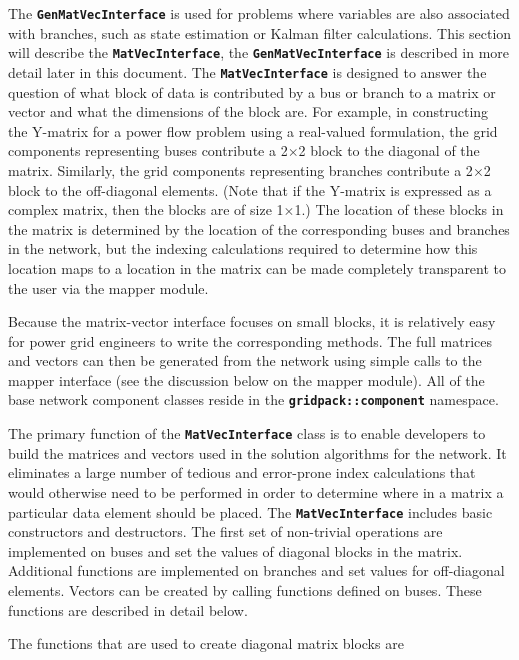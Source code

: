 \documentclass[12pt]{report} %
\begin{document}
The \texttt{\textbf{GenMatVecInterface}} is used for problems where variables are also associated with branches, such as state estimation or Kalman filter calculations. This section will describe the \texttt{\textbf{MatVecInterface}}, the \texttt{\textbf{GenMatVecInterface}} is described in more detail later in this document. The \texttt{\textbf{MatVecInterface}} is designed to answer the question of what block of data is contributed by a bus or branch to a matrix or vector and what the dimensions of the block are. For example, in constructing the Y-matrix for a power flow problem using a real-valued formulation, the grid components representing buses contribute a 2$\mathrm{\times}$2 block to the diagonal of the matrix. Similarly, the grid components representing branches contribute a 2$\mathrm{\times}$2 block to the off-diagonal elements. (Note that if the Y-matrix is expressed as a complex matrix, then the blocks are of size 1$\mathrm{\times}$1.) The location of these blocks in the matrix is determined by the location of the corresponding buses and branches in the network, but the indexing calculations required to determine how this location maps to a location in the matrix can be made completely transparent to the user via the mapper module. 

Because the matrix-vector interface focuses on small blocks, it is relatively easy for power grid engineers to write the corresponding methods. The full matrices and vectors can then be generated from the network using simple calls to the mapper interface (see the discussion below on the mapper module). All of the base network component classes reside in the \texttt{\textbf{gridpack::component}} namespace.

The primary function of the \texttt{\textbf{MatVecInterface}} class is to enable developers to build the matrices and vectors used in the solution algorithms for the network. It eliminates a large number of tedious and error-prone index calculations that would otherwise need to be performed in order to determine where in a matrix a particular data element should be placed. The \texttt{\textbf{MatVecInterface}} includes basic constructors and destructors. The first set of non-trivial operations are implemented on buses and set the values of diagonal blocks in the matrix. Additional functions are implemented on branches and set values for off-diagonal elements. Vectors can be created by calling functions defined on buses. These functions are described in detail below.

The functions that are used to create diagonal matrix blocks are
\end{document}
